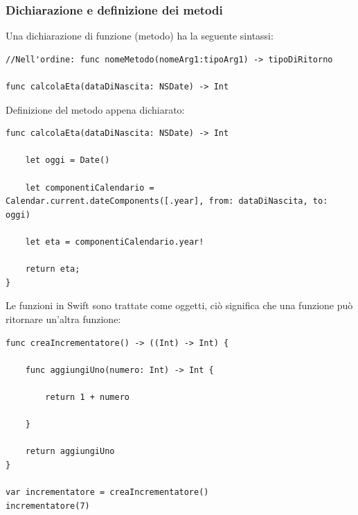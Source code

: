 \subsubsection{Dichiarazione e definizione dei metodi}
Una dichiarazione di funzione (metodo) ha la seguente sintassi: 
\lstset{language=[Objective]C, breakindent=40pt, breaklines}
\begin{lstlisting}
//Nell'ordine: func nomeMetodo(nomeArg1:tipoArg1) -> tipoDiRitorno

func calcolaEta(dataDiNascita: NSDate) -> Int

\end{lstlisting}
\newpage
Definizione del metodo appena dichiarato: 
\lstset{language=[Objective]C, breakindent=40pt, breaklines}
\begin{lstlisting}
func calcolaEta(dataDiNascita: NSDate) -> Int

	let oggi = Date()
      
    let componentiCalendario = Calendar.current.dateComponents([.year], from: dataDiNascita, to: oggi)                             			
	
	let eta = componentiCalendario.year!
	
	return eta;
}
\end{lstlisting}
Le funzioni in Swift sono trattate come oggetti, ciò significa che una funzione può ritornare un'altra funzione: 
\lstset{language=[Objective]C, breakindent=40pt, breaklines}
\begin{lstlisting}
func creaIncrementatore() -> ((Int) -> Int) {
	
	func aggiungiUno(numero: Int) -> Int {
	
		return 1 + numero 
	
	}
	
	return aggiungiUno
}

var incrementatore = creaIncrementatore()
incrementatore(7)
\end{lstlisting}
